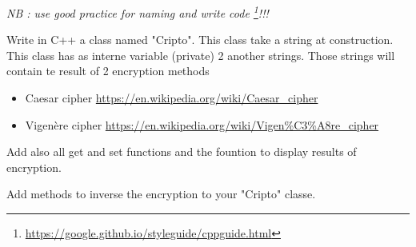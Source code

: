 \documentclass[12pt]{tdtp}
\begin{document}
\titre
\textit{NB : use good practice for naming and write code \footnote{\url{https://google.github.io/styleguide/cppguide.html}}!!!}

\Exo

Write in C++ a class named "Cripto". This class take a string at construction. This class has as interne variable (private) 2 another strings.
Those strings will contain te result of 2 encryption methods

\begin{itemize}
	\item Caesar cipher \url{https://en.wikipedia.org/wiki/Caesar_cipher}
	\item Vigenère cipher \url{https://en.wikipedia.org/wiki/Vigen%C3%A8re_cipher}
\end{itemize}

Add also all get and set functions and the fountion to display results of encryption.

\Exo

Add methods to inverse the encryption to your "Cripto" classe.
\end{document}
